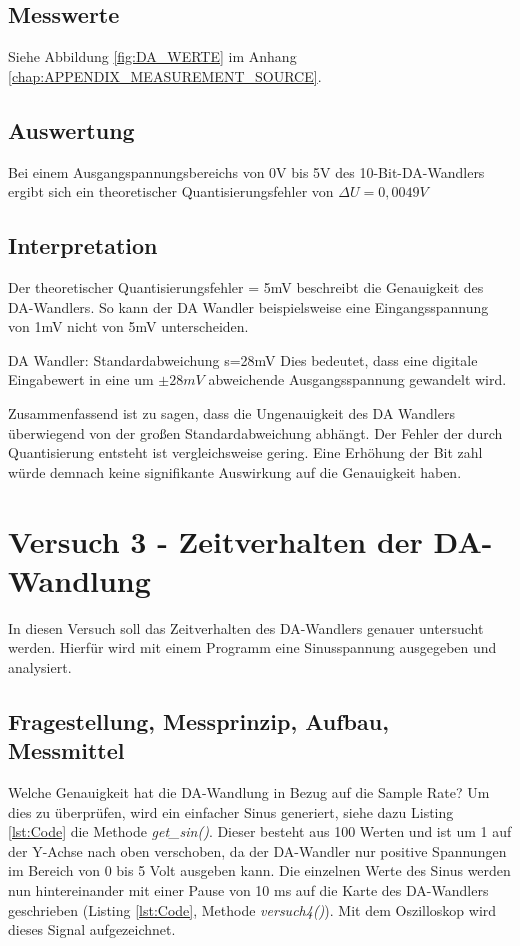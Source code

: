 \documentclass[12pt,oneside,a4paper]{report}
\begin{document}
\section{Messwerte}
\label{chap:VERSUCH_2_MESSWERTE}
Siehe Abbildung \ref{fig:DA_WERTE} im Anhang \ref{chap:APPENDIX_MEASUREMENT_SOURCE}.

\section{Auswertung}
\label{chap:VERSUCH_2_AUSWERTUNG}
Bei einem Ausgangspannungsbereichs von 0V bis 5V des 10-Bit-DA-Wandlers ergibt sich ein theoretischer Quantisierungsfehler von $\Delta U = 0,0049 V$

\section{Interpretation}
\label{chap:VERSUCH_2_INTERPRETATION}
Der theoretischer Quantisierungsfehler = 5mV beschreibt die Genauigkeit des DA-Wandlers. So kann der DA Wandler beispielsweise eine Eingangsspannung von 1mV nicht von 5mV unterscheiden.

DA Wandler:
Standardabweichung s=28mV
Dies bedeutet, dass eine digitale Eingabewert in eine um $\pm28mV$ abweichende Ausgangsspannung gewandelt wird.

Zusammenfassend ist zu sagen, dass die Ungenauigkeit des DA Wandlers überwiegend von der großen Standardabweichung abhängt. Der Fehler der durch Quantisierung entsteht ist vergleichsweise gering. Eine Erhöhung der Bit zahl würde demnach keine signifikante Auswirkung auf die Genauigkeit haben.

%
%
\chapter{Versuch 3 - Zeitverhalten der DA-Wandlung}
\label{chap:VERSUCH_3}

In diesen Versuch soll das Zeitverhalten des DA-Wandlers genauer untersucht werden.
Hierfür wird mit einem Programm eine Sinusspannung ausgegeben und analysiert.

\section{Fragestellung, Messprinzip, Aufbau, Messmittel}
\label{chap:VERSUCH_3_FRAGESTELLUNG}

Welche Genauigkeit hat die DA-Wandlung in Bezug auf die Sample Rate?
Um dies zu überprüfen, wird ein einfacher Sinus generiert, siehe dazu Listing \ref{lst:Code} die Methode \textit{get\_sin()}. Dieser besteht aus 100 Werten und ist um 1 auf der Y-Achse nach oben verschoben, da der DA-Wandler nur positive Spannungen im Bereich von 0 bis 5 Volt ausgeben kann. Die einzelnen Werte des Sinus werden nun hintereinander mit einer Pause von 10 ms auf die Karte des DA-Wandlers geschrieben (Listing \ref{lst:Code},  Methode \textit{versuch4()}). Mit dem Oszilloskop wird dieses Signal aufgezeichnet.
\end{document}
